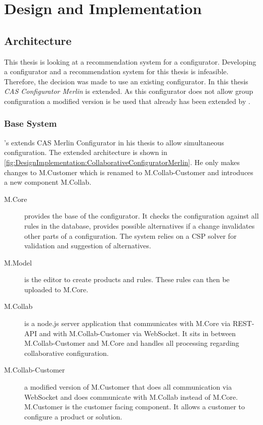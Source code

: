 \chapter{Design and Implementation}
\label{ch:DesignImplementation}

\section{Architecture}
\label{sec:DesignImplementation:Architecture}

This thesis is looking at a recommendation system for a configurator. Developing a configurator and a recommendation system for this thesis is infeasible. Therefore, the decision was made to use an existing configurator. In this thesis \emph{CAS Configurator Merlin} \cite{IndustrySpecificProduct2020} is extended. As this configurator does not allow group configuration a modified version is be used that already has been extended by \citeauthor{raabKollaborativeProduktkonfigurationEchtzeit2019} \cite{raabKollaborativeProduktkonfigurationEchtzeit2019}. 

\subsection{Base System}
\label{subsec:DesignImplementation:BaseSystem}

\citeauthor{raabKollaborativeProduktkonfigurationEchtzeit2019}'s \cite{raabKollaborativeProduktkonfigurationEchtzeit2019} extends CAS Merlin Configurator in his thesis to allow simultaneous configuration. The extended architecture is shown in \autoref{fig:DesignImplementation:CollaborativeConfiguratorMerlin}.
He only makes changes to M.Customer which is renamed to M.Collab-Customer and introduces a new component M.Collab.

\begin{description}
    \item[M.Core] provides the base of the configurator. It checks the configuration against all rules in the database, provides possible alternatives if a change invalidates other parts of a configuration. The system relies on a CSP solver for validation and suggestion of alternatives.
    \item[M.Model] is the editor to create products and rules. These rules can then be uploaded to M.Core.
    \item[M.Collab] is a node.js server application that communicates with M.Core via REST-API and with M.Collab-Customer via WebSocket. It sits in between M.Collab-Customer and M.Core and handles all processing regarding collaborative configuration.
    \item[M.Collab-Customer] a modified version of M.Customer that does all communication via WebSocket and does communicate with M.Collab instead of M.Core. M.Customer is the customer facing component. It allows a customer to configure a product or solution.
\end{description}

